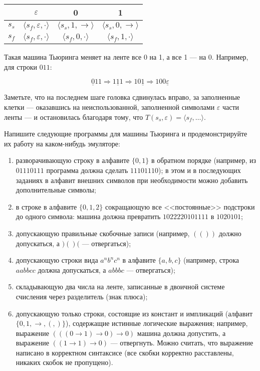 \documentclass[10pt,a4paper,oneside]{article}
\begin{document}
\begin{enumerate}
\begin{center}\begin{tabular}{c|ccc}
    & $\varepsilon$ & 0 & 1\\\hline
$s_s$ & $\langle s_f,\varepsilon,\cdot\rangle$ & $\langle s_s,1,\rightarrow\rangle$ & $\langle s_s,0,\rightarrow\rangle$\\
$s_f$ & $\langle s_f,\varepsilon,\cdot\rangle$ & $\langle s_f,0,\cdot\rangle$ & $\langle s_f,1,\cdot\rangle$
\end{tabular}\end{center}

Такая машина Тьюринга меняет на ленте все 0 на 1, а все 1 --- на 0. Например, для строки $011$:

$$\underline{0}11 \Rightarrow 1\underline{1}1 \Rightarrow 10\underline{1} \Rightarrow 100\underline{\varepsilon}$$

Заметьте, что на последнем шаге головка сдвинулась вправо, за заполненные клетки --- оказавшись на неиспользованной, заполненной символами $\varepsilon$
части ленты --- и остановилась благодаря 
тому, что $T(s_s, \varepsilon) = \langle s_f, \dots \rangle$.

Напишите следующие программы для машины Тьюринга и продемонстрируйте их работу на каком-нибудь эмуляторе:
\begin{enumerate}
\item разворачивающую строку в алфавите $\{0,1\}$ в обратном порядке (например, из $01110111$ программа должна сделать $11101110$);
в этом и в последующих заданиях в алфавит внешних символов при необходимости можно добавить дополнительные символы;
\item в строке в алфавите $\{0,1,2\}$ сокращающую все <<постоянные>> подстроки до одного символа:
машина должна превратить $1022220101111$ в $1020101$;
\item допускающую правильные скобочные записи (например, $(())$ должно допускаться, а $)()($ --- отвергаться);
\item допускающую строки вида $a^nb^nc^n$ в алфавите $\{a,b,c\}$ (например, строка $aabbcc$ должна допускаться, а $abbbc$ --- отвергаться);
\item складывающую два числа на ленте, записанные в двоичной системе счисления через разделитель (знак плюса);
\item допускающую только строки, состоящие из констант и импликаций (алфавит $\{ 0, 1, \rightarrow, (, ) \}$), 
содержащие истинные логические выражения;
например, выражение $(((0 \rightarrow 1) \rightarrow 0) \rightarrow 0)$ машина должна допустить, а
выражение $((1 \rightarrow 1) \rightarrow 0)$ --- отвергнуть. Можно считать, что выражение написано в корректном синтаксисе (все скобки корректно
расставлены, никаких скобок не пропущено).
\end{enumerate}


\end{enumerate}
\end{document}
